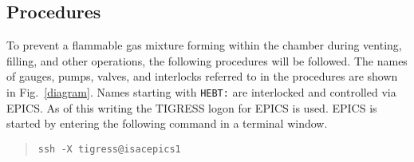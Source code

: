 
\lhead{\rightmark}
\subsection{Procedures}
\label{procedures}
To prevent a flammable gas mixture forming within the chamber during venting, filling, and other operations,
the following procedures will be followed. The names of gauges, pumps, valves, and interlocks referred to in the procedures are shown in Fig.~\ref{diagram}. Names starting with \texttt{HEBT:} are interlocked and controlled via EPICS. As of this writing the TIGRESS logon for EPICS is used. EPICS is started by entering the following command in a terminal window.
\vsetlinux
\begin{quote}
\begin{Verbatim}
ssh -X tigress@isacepics1
\end{Verbatim}
\end{quote}

